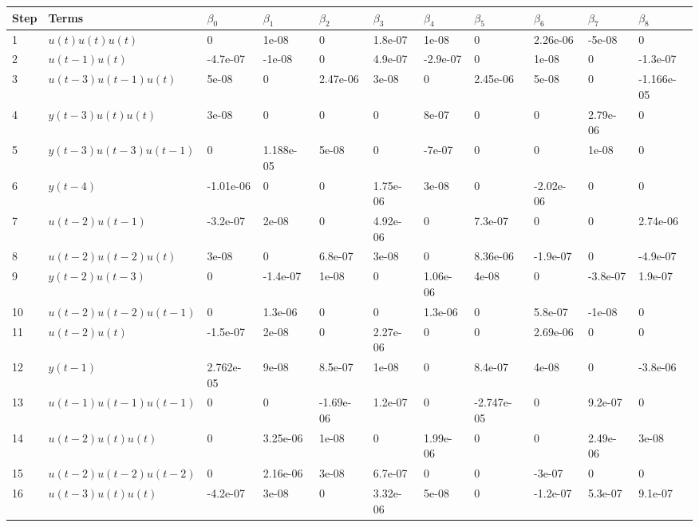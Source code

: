 \begin{tabular}{lllllllllll}
Step & Terms & $\beta_{0}$ & $\beta_{1}$ & $\beta_{2}$ & $\beta_{3}$ & $\beta_{4}$ & $\beta_{5}$ & $\beta_{6}$ & $\beta_{7}$ & $\beta_{8}$ \\ 
\hline 
1 & $u(t)u(t)u(t)$ & 0 & 1e-08 & 0 & 1.8e-07 & 1e-08 & 0 & 2.26e-06 & -5e-08 & 0 \\ 
2 & $u(t-1)u(t)$ & -4.7e-07 & -1e-08 & 0 & 4.9e-07 & -2.9e-07 & 0 & 1e-08 & 0 & -1.3e-07 \\ 
3 & $u(t-3)u(t-1)u(t)$ & 5e-08 & 0 & 2.47e-06 & 3e-08 & 0 & 2.45e-06 & 5e-08 & 0 & -1.166e-05 \\ 
4 & $y(t-3)u(t)u(t)$ & 3e-08 & 0 & 0 & 0 & 8e-07 & 0 & 0 & 2.79e-06 & 0 \\ 
5 & $y(t-3)u(t-3)u(t-1)$ & 0 & 1.188e-05 & 5e-08 & 0 & -7e-07 & 0 & 0 & 1e-08 & 0 \\ 
6 & $y(t-4)$ & -1.01e-06 & 0 & 0 & 1.75e-06 & 3e-08 & 0 & -2.02e-06 & 0 & 0 \\ 
7 & $u(t-2)u(t-1)$ & -3.2e-07 & 2e-08 & 0 & 4.92e-06 & 0 & 7.3e-07 & 0 & 0 & 2.74e-06 \\ 
8 & $u(t-2)u(t-2)u(t)$ & 3e-08 & 0 & 6.8e-07 & 3e-08 & 0 & 8.36e-06 & -1.9e-07 & 0 & -4.9e-07 \\ 
9 & $y(t-2)u(t-3)$ & 0 & -1.4e-07 & 1e-08 & 0 & 1.06e-06 & 4e-08 & 0 & -3.8e-07 & 1.9e-07 \\ 
10 & $u(t-2)u(t-2)u(t-1)$ & 0 & 1.3e-06 & 0 & 0 & 1.3e-06 & 0 & 5.8e-07 & -1e-08 & 0 \\ 
11 & $u(t-2)u(t)$ & -1.5e-07 & 2e-08 & 0 & 2.27e-06 & 0 & 0 & 2.69e-06 & 0 & 0 \\ 
12 & $y(t-1)$ & 2.762e-05 & 9e-08 & 8.5e-07 & 1e-08 & 0 & 8.4e-07 & 4e-08 & 0 & -3.8e-06 \\ 
13 & $u(t-1)u(t-1)u(t-1)$ & 0 & 0 & -1.69e-06 & 1.2e-07 & 0 & -2.747e-05 & 0 & 9.2e-07 & 0 \\ 
14 & $u(t-2)u(t)u(t)$ & 0 & 3.25e-06 & 1e-08 & 0 & 1.99e-06 & 0 & 0 & 2.49e-06 & 3e-08 \\ 
15 & $u(t-2)u(t-2)u(t-2)$ & 0 & 2.16e-06 & 3e-08 & 6.7e-07 & 0 & 0 & -3e-07 & 0 & 0 \\ 
16 & $u(t-3)u(t)u(t)$ & -4.2e-07 & 3e-08 & 0 & 3.32e-06 & 5e-08 & 0 & -1.2e-07 & 5.3e-07 & 9.1e-07 \\ 
\hline 
\end{tabular}
